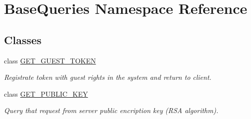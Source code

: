 \hypertarget{namespace_base_queries}{}\section{Base\+Queries Namespace Reference}
\label{namespace_base_queries}
\subsection*{Classes}
\begin{DoxyCompactItemize}
\item 
class \mbox{\hyperlink{class_base_queries_1_1_g_e_t___g_u_e_s_t___t_o_k_e_n}{G\+E\+T\+\_\+\+G\+U\+E\+S\+T\+\_\+\+T\+O\+K\+EN}}
\begin{DoxyCompactList}\small\item\em Registrate token with guest rights in the system and return to client. \end{DoxyCompactList}\item 
class \mbox{\hyperlink{class_base_queries_1_1_g_e_t___p_u_b_l_i_c___k_e_y}{G\+E\+T\+\_\+\+P\+U\+B\+L\+I\+C\+\_\+\+K\+EY}}
\begin{DoxyCompactList}\small\item\em Query that request from server public encription key (R\+SA algorithm). \end{DoxyCompactList}\end{DoxyCompactItemize}
